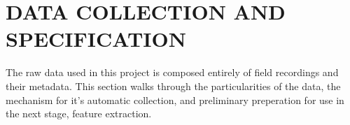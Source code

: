 \chapter{DATA COLLECTION AND SPECIFICATION}

The raw data used in this project is composed entirely of field recordings
and their metadata.
This section walks through the particularities of the data, the mechanism for
it's automatic collection, and preliminary preperation for use in the next
stage, feature extraction.

